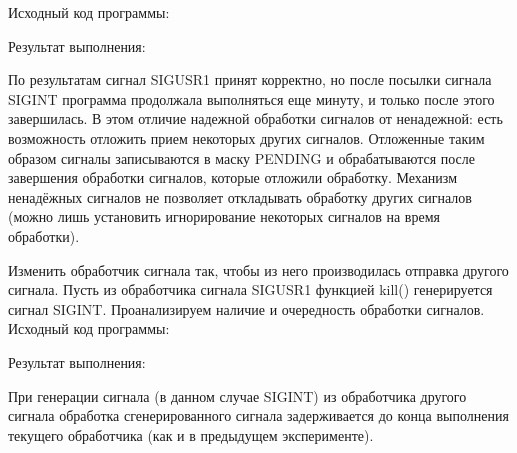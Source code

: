 \documentclass[a4paper]{article}
\begin{document}
	Исходный код программы:
	
	
	Результат выполнения:
	


	По результатам сигнал SIGUSR1 принят корректно, но после посылки сигнала SIGINT программа продолжала выполняться еще минуту, и только после этого завершилась. В этом отличие надежной обработки сигналов от ненадежной: есть возможность отложить прием некоторых других сигналов. Отложенные таким образом сигналы записываются в маску PENDING и обрабатываются после завершения обработки сигналов, которые отложили обработку. Механизм ненадёжных сигналов не позволяет откладывать обработку других сигналов (можно лишь установить игнорирование некоторых сигналов на время обработки).
	
	Изменить обработчик сигнала так, чтобы из него производилась отправка другого сигнала. Пусть из обработчика сигнала SIGUSR1 функцией kill() генерируется сигнал SIGINT. Проанализируем наличие и очередность обработки сигналов.	
	Исходный код программы:
	
	
	Результат выполнения:
	
	
	При генерации сигнала (в данном случае SIGINT) из обработчика другого сигнала обработка сгенерированного сигнала задерживается до конца выполнения текущего обработчика (как и в предыдущем эксперименте).
\end{document}
